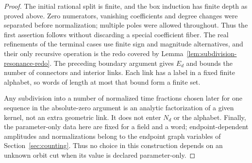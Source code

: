 \begin{proof}
The initial rational split is finite, and the box induction has finite
depth as proved above.  Zero numerators, vanishing coefficients and
degree changes were separated before normalization; multiple poles
were allowed throughout.  Thus the first assertion follows without
discarding a special coefficient fiber.  The real refinements of the
terminal cases use finite sign and magnitude alternatives, and their
only recursive operation is the redo covered by
Lemma~\ref{lem:subdivision-resonance-redo}.  The preceding boundary
argument gives $E_d$ and bounds the number of connectors and interior
links.  Each link has a label in a fixed finite alphabet, so words of
length at most that bound form a finite set.

Any subdivision into a number of normalized time fractions chosen
later for one sequence in the absolute-zero argument is an analytic
factorization of a given kernel, not an extra geometric link.  It does
not enter $N_d$ or the alphabet.  Finally, the parameter-only data here
are fixed for a field and a word; endpoint-dependent amplitudes and
normalizations belong to the endpoint graph variables of
Section~\ref{sec:counting}.  Thus no choice in this construction depends
on an unknown orbit cut when its value is declared parameter-only.
\end{proof}
